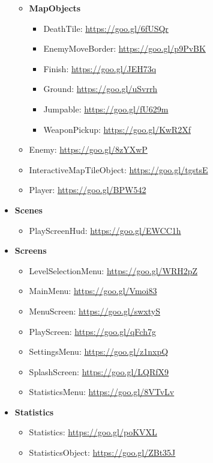 \documentclass[12p]{article}
\begin{document}
\begin{itemize}
\begin{itemize}
    \item[\faFolderOpen] \textbf{MapObjects}
    \begin{itemize}
      \item DeathTile: \url{https://goo.gl/6fUSQr}
      \item EnemyMoveBorder: \url{https://goo.gl/p9PvBK}
      \item Finish: \url{https://goo.gl/JEH73q}
      \item Ground: \url{https://goo.gl/uSvrrh}
      \item Jumpable: \url{https://goo.gl/fU629m}
      \item WeaponPickup: \url{https://goo.gl/KwR2Xf}
    \end{itemize}
    
    \item Enemy: \url{https://goo.gl/8zYXwP}
    \item InteractiveMapTileObject: \url{https://goo.gl/tgstsE}
    \item Player: \url{https://goo.gl/BPW542}
  \end{itemize}
  
  \item \textbf{Scenes}
  \begin{itemize}
    \item PlayScreenHud: \url{https://goo.gl/EWCC1h}
  \end{itemize}
  
  \item \textbf{Screens}
  \begin{itemize}
    \item LevelSelectionMenu: \url{https://goo.gl/WRH2pZ}
    \item MainMenu: \url{https://goo.gl/Vmoi83}
    \item MenuScreen: \url{https://goo.gl/swxtyS}
    \item PlayScreen: \url{https://goo.gl/qFch7g}
    \item SettingsMenu: \url{https://goo.gl/z1nxpQ}
    \item SplashScreen: \url{https://goo.gl/LQRfX9}
    \item StatisticsMenu: \url{https://goo.gl/8VTvLv}
  \end{itemize}
  
  \item \textbf{Statistics}
  \begin{itemize}
    \item Statistics: \url{https://goo.gl/poKVXL}
    \item StatisticsObject: \url{https://goo.gl/ZBt35J}
  \end{itemize}
  

\end{itemize}
\end{document}
